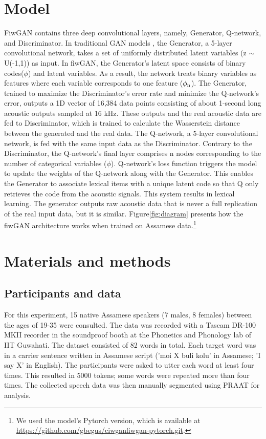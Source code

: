 \documentclass{Interspeech2024}
\begin{document}
\section{Model}
FiwGAN \cite{begus_ciwgan_2021} contains three deep convolutional layers, namely, Generator, Q-network, and Discriminator. In traditional GAN models \cite{goodfellow_generative_2014,donahue_adversarial_2018}, the Generator, a 5-layer convolutional network, takes a set of uniformly distributed latent variables (z $\sim$ U(-1,1)) as input. In fiwGAN, the Generator's latent space consists of binary codes($\phi$) and latent variables. As a result, the network treats binary variables as features where each variable corresponds to one feature ($\phi\textsubscript{n}$)\cite{begus_ciwgan_2021}. The Generator, trained to maximize the Discriminator's error rate and minimize the Q-network's error, outputs a 1D vector of 16,384 data points consisting of about 1-second long acoustic outputs sampled at 16 kHz. These outputs and the real acoustic data are fed to Discriminator, which is trained to calculate the Wasserstein distance \cite{arjovsky_wasserstein_2017} between the generated and the real data. The Q-network, a 5-layer convolutional network, is fed with the same input data as the Discriminator. Contrary to the Discriminator, the Q-network's final layer comprises n nodes corresponding to the number of categorical variables ($\phi$). Q-network's loss function triggers the model to update the weights of the Q-network along with the Generator. This enables the Generator to associate lexical items with a unique latent code so that Q only retrieves the code from the acoustic signals. This system results in lexical learning. The generator outputs raw acoustic data that is never a full replication of the real input data, but it is similar. Figure\ref{fig:diagram} presents how the fiwGAN architecture works when trained on Assamese data.\footnote{We used the model's Pytorch version, which is available at \url{https://github.com/gbegus/ciwganfiwgan-pytorch.git}.}


\section{Materials and methods}

\subsection{Participants and data}
For this experiment, 15 native Assamese speakers (7 males, 8 females) between the ages of 19-35 were consulted. The data was recorded with a Tascam DR-100 MKII recorder in the soundproof booth at the Phonetics and Phonology lab of IIT Guwahati. 
The dataset consisted of 82 words in total. Each target word was in a carrier sentence written in Assamese script ('moi X buli kolu' in Assamese; 'I say X' in English). The participants were asked to utter each word at least four times. This resulted in 5000 tokens; some words were repeated more than four times. The collected speech data was then manually segmented using PRAAT\cite{boersma_praat_2009} for analysis. 
\end{document}
